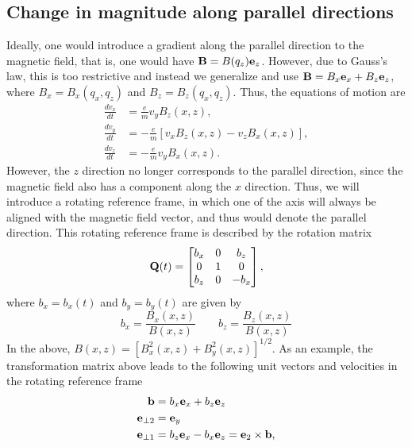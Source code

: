 \documentclass[oneside,a4paper,11pt]{report}
\begin{document}
\subsection{Change in magnitude along parallel directions}
Ideally, one would introduce a gradient along the parallel direction to the magnetic field, that is, one would have $\mathbf{B} = B(q_z) \mathbf{e}_z$. However, due to Gauss's law, this is too restrictive and instead we generalize and use $\mathbf{B} = B_x \mathbf{e}_x + B_z \mathbf{e}_z$, where $B_x = B_x(q_x,q_z)$ and $B_z = B_z(q_x,q_z)$. Thus, the equations of motion are
\begin{align}
    \frac{dv_x}{dt} &= \frac{e}{m} v_y B_z(x,z) , \label{eq:par_grad_vx_inter}\\
    \frac{dv_y}{dt} &= -\frac{e}{m} [v_x B_z(x,z) - v_z B_x(x,z)] , \label{eq:par_grad_vy_inter}\\
    \frac{dv_z}{dt} &= -\frac{e}{m} v_y B_x(x,z) \label{eq:par_grad_vz_inter}.
\end{align}
However, the $z$ direction no longer corresponds to the parallel direction, since the magnetic field also has a component along the $x$ direction. Thus, we will introduce a rotating reference frame, in which one of the axis will always be aligned with the magnetic field vector, and thus would denote the parallel direction. This rotating reference frame is described by the rotation matrix
\begin{equation}
    \mathbf{Q}(t) = \begin{bmatrix} b_x & 0 & b_z \\ 0 & 1 & 0 \\ b_z & 0 & -b_x \end{bmatrix},
\end{equation}
where $b_x = b_x(t)$ and $b_y = b_y(t)$ are given by
\begin{equation}
    b_x = \frac{B_x(x,z)}{B(x,z)} \qquad b_z = \frac{B_z(x,z)}{B(x,z)}
\end{equation}
In the above, $B(x,z) = [ B_x^2(x,z) + B_y^2(x,z) ]^{1/2}$. As an example, the transformation matrix above leads to the following unit vectors and velocities in the rotating reference frame 
\begin{align}
    \mathbf{b} &= b_x \mathbf{e}_x + b_z \mathbf{e}_z \\
    \mathbf{e}_{\perp2} &= \mathbf{e}_y \\
    \mathbf{e}_{\perp1} &= b_z \mathbf{e}_x - b_x \mathbf{e}_z = \mathbf{e}_2 \times \mathbf{b},
\end{align}
\end{document}
